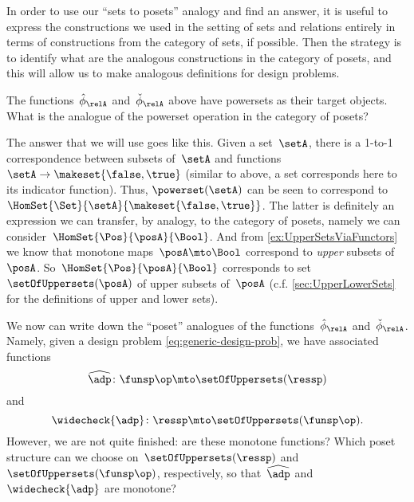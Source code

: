 In order to use our ``sets to posets'' analogy and find an answer, it is useful to express the constructions we used in the setting of sets and relations entirely in terms of constructions from the category of sets, if possible.
Then the strategy is to identify what are the analogous constructions in the category of posets, and this will allow us to make analogous definitions for design problems.

The functions~$\hat \phi_{\relA}$ and~$\check \phi_{\relA}$ above have powersets as their target objects.
What is the analogue of the powerset operation in the category of posets?

The answer that we will use goes like this.
Given a set~$\setA$, there is a 1-to-1 correspondence between subsets of~$\setA$ and functions~$\setA \to \makeset{ \false, \true }$ (similar to above, a set corresponds here to its indicator function).
Thus, $\powerset (\setA)$ can be seen to correspond to~$\HomSet{\Set}{\setA}{\makeset{ \false, \true}}$.
The latter is definitely an expression we can transfer, by analogy, to the category of posets, namely we can consider~$\HomSet{\Pos}{\posA}{\Bool}$.
And from \cref{ex:UpperSetsViaFunctors} we know that monotone maps~$\posA \mto \Bool$ correspond to \emph{upper} subsets of~$\posA$.
So~$\HomSet{\Pos}{\posA}{\Bool}$ corresponds to set~$\setOfUppersets (\posA)$ of upper subsets of~$\posA$ (c.f.
\cref{sec:UpperLowerSets} for the definitions of upper and lower sets).

We now can write down the ``poset'' analogues of the functions~$\hat \phi_{\relA}$ and~$\check \phi_{\relA}$.
Namely, given a design problem \cref{eq:generic-design-prob}, we have associated functions
\begin{equation}
    \label{eq:dp-left-curry}
    \widehat{\adp} \colon \funsp\op \mto \setOfUppersets (\ressp)
\end{equation}
and
\begin{equation}
    \label{eq:dp-right-curry}
    \widecheck{\adp} \colon \ressp \mto \setOfUppersets (\funsp\op).
\end{equation}
However, we are not quite finished: are these monotone functions?
Which poset structure can we choose on~$\setOfUppersets (\ressp)$ and~$\setOfUppersets (\funsp\op)$, respectively, so that~$\widehat{\adp}$ and~$\widecheck{\adp}$ are monotone?

